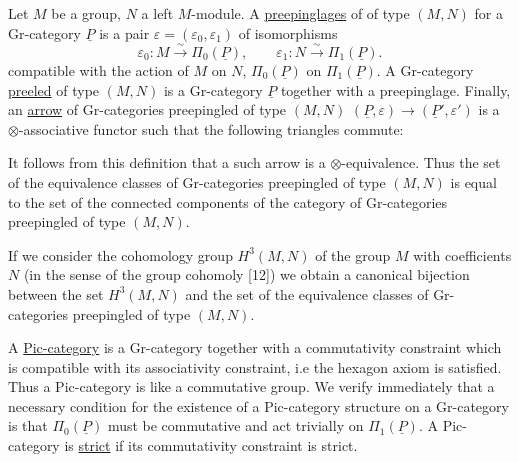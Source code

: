 Let $M$ be a group, $N$ a left $M$-module. A \uline{preepinglages} of
of type $(M,N)$ for a Gr-category $\underline{P}$ is a pair $\varepsilon=(\varepsilon_0,\varepsilon_1)$ of isomorphisms
\[
\varepsilon_0:M\xrightarrow{\sim}\Pi_0(\underline P),\qquad
\varepsilon_1:N\xrightarrow{\sim}\Pi_1(\underline P).
\]
compatible with the action of $M$ on $N$, $\Pi_0(\underline P)$ on $\Pi_1(\underline P)$. A Gr-category \margin{!}\uline{pree\mbox{}led} of type $(M,N)$ is a Gr-category $\underline P$ together with a preepinglage. Finally, an \uline{arrow} of Gr-categories preepingled of type $(M,N)$ $(\underline P,\varepsilon)\to(\underline P',\varepsilon')$ is a $\otimes$-associative functor such that the following triangles commute:

It follows from this definition that a such arrow is a $\otimes$-equivalence. Thus the set of the equivalence classes of Gr-categories preepingled of type $(M,N)$ is equal to the set of the connected components of the category of Gr-categories preepingled of type $(M,N)$.

If we consider the cohomology group $H^3(M,N)$ of the group $M$ with coefficients $N$ (in the sense of the group cohomoly  [12]) we obtain a canonical bijection between the set $H^3(M,N)$ and the set of the equivalence classes of Gr-categories preepingled of type $(M,N)$.

A \uline{Pic-category} is a Gr-category together with a commutativity constraint which is compatible with its associativity constraint, i.e the hexagon axiom is satisfied. Thus a Pic-category is like a commutative group. We verify immediately that a necessary condition for the existence of a Pic-category structure on a Gr-category is that $\Pi_0(\underline P)$ must be commutative and act trivially on $\Pi_1(\underline P)$. A Pic-category is \uline{strict} if its commutativity constraint is strict.

